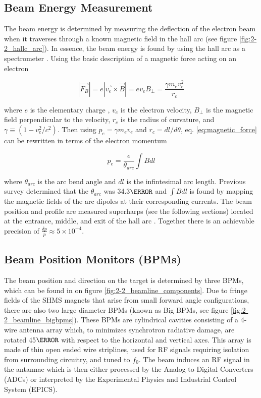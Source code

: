 \documentclass[
]{report}
\begin{document}
\hypertarget{beam-energy-measurement}{%
\subsection{Beam Energy Measurement}\label{beam-energy-measurement}}

The beam energy is determined by measuring the deflection of the
electron beam when it traverses through a known magnetic field in the
hall arc (see figure \ref{fig:2-2_hallc_arc}). In essence, the beam
energy is found by using the hall arc as a spectrometer
\cite{yan_beam_1993}. Using the basic description of a magnetic force
acting on an electron

\begin{equation} 
|\vec{F_{B}}|=e|\vec{v_e}\times\vec{B}|=ev_{e}B_{\perp}=\frac{\gamma m_{e}v^2_e}{r_c}
\label{eq:magnetic_force} 
\end{equation}

where \(e\) is the elementary charge , \(v_e\) is the electron velocity,
\(B_{\perp}\) is the magnetic field perpendicular to the velocity,
\(r_c\) is the radius of curvature, and \(\gamma\equiv(1-v^2_e/c^2)\).
Then using \(p_e=\gamma m_e v_e\) and \(r_c=dl/d\theta\), eq.
\ref{eq:magnetic_force} can be rewritten in terms of the electron
momentum

\begin{equation} 
p_e=\frac{e}{\theta_{arc}}\int B dl
\label{eq:electron_momentum} 
\end{equation}

where \(\theta_{arc}\) is the arc bend angle and \(dl\) is the
infintesimal arc length. Previous survey determined that the
\(\theta_{arc}\) was 34.3\(\degree\) and \(\int B dl\) is found by
mapping the magnetic fields of the arc dipoles at their corresponding
currents. The beam position and profile are measured superharps (see the
following sections) located at the entrance, middle, and exit of the
hall arc \cite{yan_superharp_1995}. Together there is an achievable
precision of \(\frac{\delta p}{p}\approx 5\times 10^{-4}\).

\hypertarget{beam-position-monitors-bpms}{%
\subsection{Beam Position Monitors
(BPMs)}\label{beam-position-monitors-bpms}}

The beam position and direction on the target is determined by three
BPMs, which can be found in on figure \ref{fig:2-2_beamline_components}.
Due to fringe fields of the SHMS magnets that arise from small forward
angle configurations, there are also two large diameter BPMs (known as
Big BPMs, see figure \ref{fig:2-2_beamline_bigbpms}). These BPMs are
cylindrical cavities consisting of a 4-wire antenna array which, to
minimizes synchrotron radiative damage, are rotated 45\(\degree\) with
respect to the horizontal and vertical axes. This array is made of thin
open ended wire striplines, used for RF signals requiring isolation from
surrounding circuitry, and tuned to \(f_0\). The beam induces an RF
signal in the antannae which is then either processed by the
Analog-to-Digital Converters (ADCs) or interpreted by the Experimental
Physics and Industrial Control System (EPICS).
\end{document}
